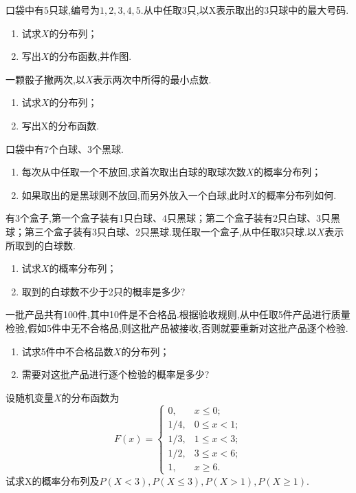 \begin{xiti}
\item 口袋中有$ 5 $只球,编号为$ 1,2,3,4,5 $.从中任取$ 3 $只,以X表示取出的$ 3 $只球中的最大号码.
\begin{enumerate}
  \item 试求$ X $的分布列；
  \item 写出$ X $的分布函数,并作图.
\end{enumerate}

\item 一颗骰子撇两次,以$ X $表示两次中所得的最小点数.
\begin{enumerate}
  \item 试求$ X $的分布列；
  \item 写出X的分布函数.
\end{enumerate}

\item 口袋中有$ 7 $个白球、$ 3 $个黑球.
  \begin{enumerate}
    \item 每次从中任取一个不放回,求首次取出白球的取球次数$ X $的概率分布列；
    \item 如果取出的是黑球则不放回,而另外放入一个白球,此时$ X $的概率分布列如何.
  \end{enumerate}

\item 有$ 3 $个盒子,第一个盒子装有1只白球、$ 4 $只黑球；第二个盒子装有$ 2 $只白球、3只黑球；第三个盒子装有$ 3 $只白球、$ 2 $只黑球.现任取一个盒子,从中任取3只球.以$ X $表示所取到的白球数.
  \begin{enumerate}
    \item 试求$ X $的概率分布列；
    \item 取到的白球数不少于2只的概率是多少?
  \end{enumerate}

\item 一批产品共有100件,其中10件是不合格品.根据验收规则,从中任取5件产品进行质量检验,假如5件中无不合格品,则这批产品被接收,否则就要重新对这批产品逐个检验.
  \begin{enumerate}
    \item 试求5件中不合格品数$ X $的分布列；
    \item 需要对这批产品进行逐个检验的概率是多少?
  \end{enumerate}

\item 设随机变量$ X $的分布函数为
\[
  F(x) = \begin{cases}
    0, & x \le 0; \\
    1 / 4, & 0 \leqslant x<1; \\
    1 / 3, & 1 \leqslant x<3; \\
    1 / 2, & 3 \leqslant x<6; \\
    1, & x \geqslant 6.
  \end{cases}
\]
试求X的概率分布列及$P(X<3), P(X \leqslant 3), P(X>1), P(X \geqslant 1)$.


\end{xiti}

